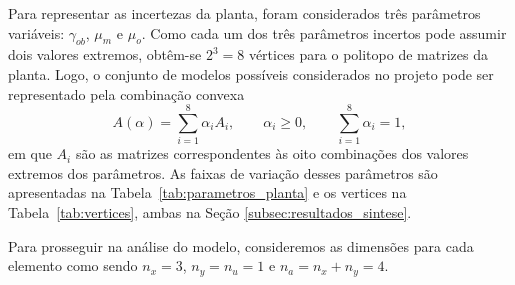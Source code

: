 Para representar as incertezas da planta, foram considerados três parâmetros variáveis: $\gamma_{ob}$, $\mu_m$ e $\mu_o$. Como cada um dos três parâmetros incertos pode assumir dois valores extremos, obtêm-se $2^3=8$ vértices para o politopo de matrizes da planta. Logo, o conjunto de modelos possíveis considerados no projeto pode ser representado pela combinação convexa
\begin{equation}
    A(\alpha)=\sum_{i=1}^{8}\alpha_i A_i,\qquad
    \alpha_i\geq 0,\qquad\sum_{i=1}^{8}\alpha_i=1,
    \label{eq:politopo}
\end{equation}
em que $A_i$ são as matrizes correspondentes às oito combinações dos valores extremos dos parâmetros. As faixas de variação desses parâmetros são apresentadas na Tabela~\ref{tab:parametros_planta} e os vertices na Tabela~\ref{tab:vertices}, ambas na Seção \ref{subsec:resultados_sintese}.

\noindent
Para prosseguir na análise do modelo, consideremos as dimensões para cada elemento como sendo $n_x=3$, $n_y=n_u=1$ e $n_a=n_x+n_y=4$.
